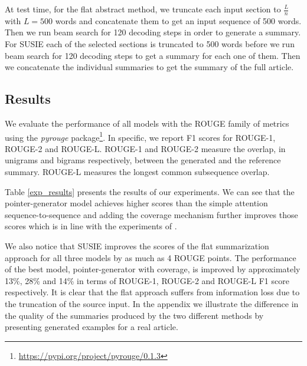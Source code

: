 \documentclass[runningheads]{llncs}
\begin{document}

At test time, for the flat abstract method, we truncate each input section to $\frac{L}{n}$ with $L=500$ words and concatenate them to get an input sequence of 500 words. Then we run beam search for 120 decoding steps in order to generate a summary. For SUSIE each of the selected sections is truncated to 500 words before we run beam search for 120 decoding steps to get a summary for each one of them. Then we concatenate the individual summaries to get the summary of the full article.

\subsection{Results}

We evaluate the performance of all models with the ROUGE family of metrics~\cite{Lin2004Rouge:Summaries} using the {\em pyrouge} package\footnote{\url{https://pypi.org/project/pyrouge/0.1.3}}. In specific, we report F1 scores for ROUGE-1, ROUGE-2 and ROUGE-L. ROUGE-1 and ROUGE-2 measure the overlap, in unigrams and bigrams respectively, between the generated and the reference summary. ROUGE-L measures the longest common subsequence overlap.


Table \ref{exp_results} presents the results of our experiments. We can see that the pointer-generator model achieves higher scores than the simple attention sequence-to-sequence and adding the coverage mechanism further improves those scores which is in line with the experiments of \cite{See2017GetNetworks}. 

We also notice that SUSIE improves the scores of the flat summarization approach for all three models by as much as 4 ROUGE points. The performance of the best model, pointer-generator with coverage, is improved by approximately 13\%, 28\% and 14\% in terms of ROUGE-1, ROUGE-2 and ROUGE-L F1 score respectively. It is clear that the flat approach suffers from information loss due to the truncation of the source input.  
In the appendix we illustrate the difference in the quality of the summaries produced by the two different methods by presenting generated examples for a real article. 
\end{document}
